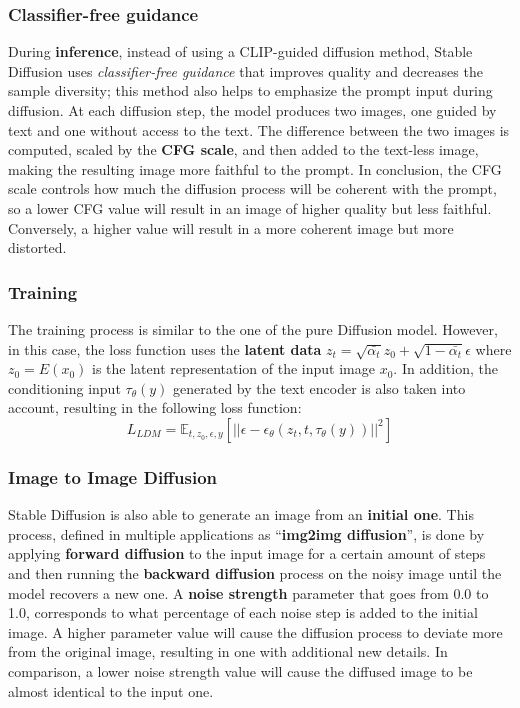 \documentclass[preprint]{elsarticle}
\begin{document}
\subsubsection{Classifier-free guidance}
During \textbf{inference}, instead of using a CLIP-guided diffusion method, Stable Diffusion uses 
\emph{classifier-free guidance} \cite{ho2022classifierfree}
that improves quality and decreases the sample diversity; 
this method also helps to emphasize the prompt input during diffusion. 
At each diffusion step, the model produces two images, one guided by text and one without access to the text. 
The difference between the two images is computed, scaled by the \textbf{CFG scale}, and then added to the text-less image, 
making the resulting image more faithful to the prompt. 
In conclusion, the CFG scale controls how much the diffusion process will be coherent with the prompt, 
so a lower CFG value will result in an image of higher quality but less faithful. Conversely, 
a higher value will result in a more coherent image but more distorted.

\subsubsection{Training}
The training process is similar to the one of the pure Diffusion model.
However, in this case, the loss function
uses the \textbf{latent data} $z_t=\sqrt{\bar{\alpha_t}}z_0 + \sqrt{1-\bar{\alpha_t}}\epsilon$ where
$z_0 = E(x_0)$ is the latent representation of the input image $x_0$.
In addition, the conditioning input $\tau_\theta(y)$ generated by the text encoder is also taken into account,
resulting in the following loss function:
\begin{equation}
	L_{LDM} = \mathbb{E}_{t,z_0,\epsilon,y}\left[||\epsilon-\epsilon_\theta(z_t,t,\tau_\theta(y))||^2\right]
\end{equation}

\subsubsection{Image to Image Diffusion}
Stable Diffusion is also able to generate an image from an \textbf{initial one}. This process, defined in multiple applications 
as ``\textbf{img2img diffusion}'', is done by applying \textbf{forward diffusion} to the input image for a certain amount of steps and then 
running the \textbf{backward diffusion} process on the noisy image until the model recovers a new one. A \textbf{noise strength} parameter 
that goes from 0.0 to 1.0, corresponds to what percentage of each noise step is added to the initial image. 
A higher parameter value will cause the diffusion process to deviate more from the original image, resulting in one with 
additional new details. 
In comparison, a lower noise strength value will cause the diffused image to be almost identical to the input one.
\end{document}

